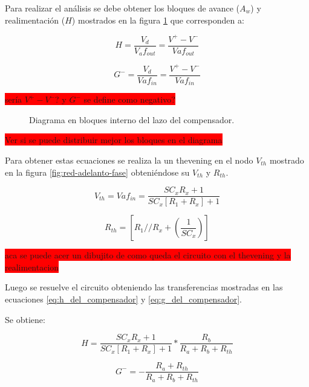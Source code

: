 Para realizar el análisis se debe obtener los bloques de avance ($A_w$) y realimentación ($H$) mostrados en la figura \ref{fig:diag-diagrama_lazo_compensador} que corresponden a:


\begin{equation} 
	H = \frac{V_d}{V_af_{out}}=\frac{V^+ - V^-}{Vaf_{out}}
	\label{eq:h_del_compensador}
\end{equation} 

\begin{equation} 
	G^- = \frac{V_d}{Vaf_{in}}=\frac{V^+ - V^-}{Vaf_{in}}
	\label{eq:g_del_compensador}
\end{equation}

\colorbox{red}{sería $V^+-V^-$?  y $G^-$ se define como negativo?}

\begin{figure}[H]
	\centering
	
	\caption{Diagrama en bloques interno del lazo del compensador.}	
	\label{fig:diag-diagrama_lazo_compensador}
\end{figure}
\colorbox{red}{Ver si se puede distribuir mejor los bloques en el diagrama}

Para obtener estas ecuaciones se realiza la un thevening en el nodo $V_{th}$ mostrado en la figura \ref{fig:red-adelanto-fase} obteniéndose su $V_{th}$ y $R_{th}$.

\begin{equation} 
	V_{th} = Vaf_{in}= \frac{SC_xR_x+1}{SC_x[R_1+R_x]+1}
\end{equation}

\begin{equation} 
	R_{th} = [R_1 // R_x+(\frac{1}{SC_x})]
\end{equation}

\colorbox{red}{aca se puede acer un dibujito de como queda el circuito con el thevening y la realimentacion}

Luego se resuelve el circuito obteniendo las transferencias mostradas en las ecuaciones \ref{eq:h_del_compensador} y \ref{eq:g_del_compensador}.

Se obtiene:

\begin{equation} 
	H = \frac{SC_xR_x+1}{SC_x[R_1+R_x]+1} * \frac{R_b}{R_a + R_b + R_{th}}
\end{equation}

\begin{equation} 
	G^- = - \frac{R_a + R_{th}}{R_a + R_b + R_{th}}
\end{equation}

